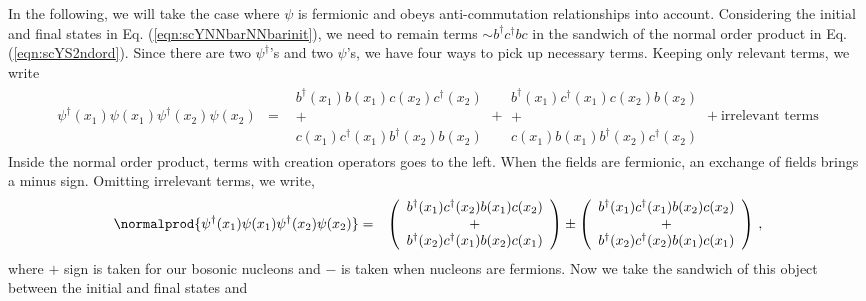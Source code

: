 {In the following, we will take the case where $\psi$ is fermionic and obeys
anti-commutation relationships into account.
Considering the initial and final states in Eq. (\ref{eqn:scYNNbarNNbarinit}),
we need to remain terms $\sim b^\dagger c^\dagger bc$ in the sandwich of 
the normal order product in Eq. (\ref{eqn:scYS2ndord}). Since there are two
$\psi^\dagger$'s and two $\psi$'s, we have four ways to pick up necessary terms.
Keeping only relevant terms, we write
\begin{eqnarray}
\psi^\dagger(x_1) \psi(x_1) \psi^\dagger (x_2) \psi(x_2)
&=& 
\begin{array}{c}
b^\dagger(x_1) b(x_1) c(x_2) c^\dagger(x_2)
\\
+
\\
c(x_1) c^\dagger(x_1) b^\dagger(x_2) b(x_2)
\end{array}
+
\begin{array}{c}
b^\dagger(x_1) c^\dagger(x_1) c(x_2) b(x_2)
\\
+
\\
c(x_1) b(x_1) b^\dagger(x_2) c^\dagger(x_2)
\end{array}
+ \mbox{irrelevant terms}
\nonumber
\end{eqnarray}
Inside the normal order product, terms with creation operators goes to the left.
When the fields are fermionic, an exchange of fields brings a minus sign. 
Omitting irrelevant terms, we write,
\begin{eqnarray}
\normalprod{\psi^\dagger(x_1) \psi(x_1) \psi^\dagger (x_2) \psi(x_2)}
&=& 
\left(
\begin{array}{c}
b^\dagger(x_1) c^\dagger(x_2) b(x_1) c(x_2) 
\\
+
\\
b^\dagger(x_2) c^\dagger(x_1) b(x_2) c(x_1)   
\end{array}
\right)
\pm
\left(
\begin{array}{c}
b^\dagger(x_1) c^\dagger(x_1) b(x_2) c(x_2)
\\
+
\\
b^\dagger(x_2) c^\dagger(x_2) b(x_1)  c(x_1)
\end{array}
\right)
\,,
\nonumber
\end{eqnarray}
where $+$ sign is taken for our bosonic nucleons and
$-$ is taken when nucleons are fermions.
Now we take the sandwich of this object between the initial and final states and
}
